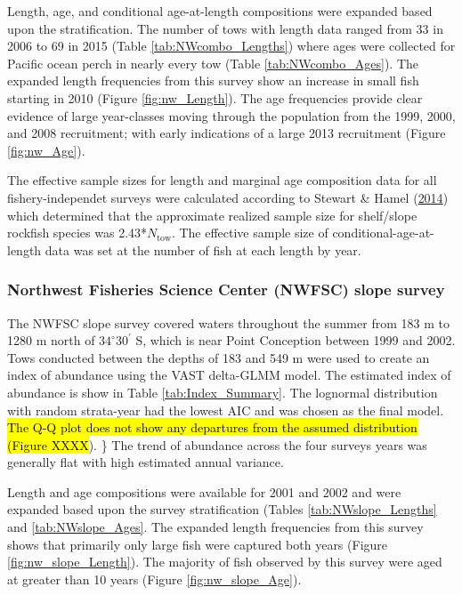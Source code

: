 \documentclass[12pt,]{article}
\begin{document}
Length, age, and conditional age-at-length compositions were expanded
based upon the stratification. The number of tows with length data
ranged from 33 in 2006 to 69 in 2015 (Table \ref{tab:NWcombo_Lengths})
where ages were collected for Pacific ocean perch in nearly every tow
(Table \ref{tab:NWcombo_Ages}). The expanded length frequencies from
this survey show an increase in small fish starting in 2010 (Figure
\ref{fig:nw_Length}). The age frequencies provide clear evidence of
large year-classes moving through the population from the 1999, 2000,
and 2008 recruitment; with early indications of a large 2013 recruitment
(Figure \ref{fig:nw_Age}).

The effective sample sizes for length and marginal age composition data
for all fishery-independet surveys were calculated according to Stewart
\& Hamel (\protect\hyperlink{ref-stewart_bootstrapping_2014}{2014})
which determined that the approximate realized sample size for
shelf/slope rockfish species was 2.43*\(N_{\text{tow}}\). The effective
sample size of conditional-age-at-length data was set at the number of
fish at each length by year.

\subsubsection{Northwest Fisheries Science Center (NWFSC) slope
survey}\label{northwest-fisheries-science-center-nwfsc-slope-survey}

The NWFSC slope survey covered waters throughout the summer from 183 m
to 1280 m north of \(34^\circ 30^\prime\) S, which is near Point
Conception between 1999 and 2002. Tows conducted between the depths of
183 and 549 m were used to create an index of abundance using the VAST
delta-GLMM model. The estimated index of abundance is show in Table
\ref{tab:Index_Summary}. The lognormal distribution with random
strata-year had the lowest AIC and was chosen as the final model.
\hl{The Q-Q plot does not show any departures from the assumed distribution (Figure XXXX}).
\} The trend of abundance across the four surveys years was generally
flat with high estimated annual variance.

Length and age compositions were available for 2001 and 2002 and were
expanded based upon the survey stratification (Tables
\ref{tab:NWslope_Lengths} and \ref{tab:NWslope_Ages}. The expanded
length frequencies from this survey shows that primarily only large fish
were captured both years (Figure \ref{fig:nw_slope_Length}). The
majority of fish observed by this survey were aged at greater than 10
years (Figure \ref{fig:nw_slope_Age}).
\end{document}
